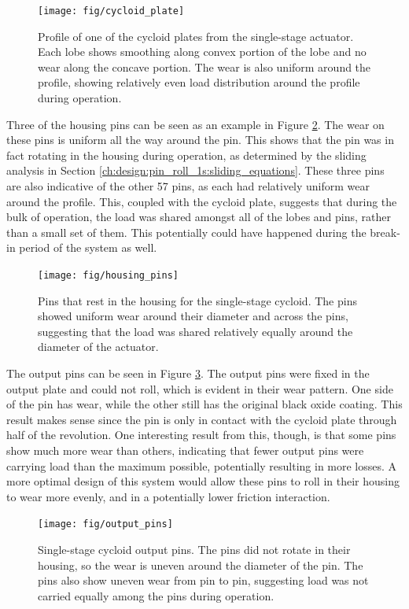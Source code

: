 \begin{figure}[!t]
   \centering
   \texttt{[image: fig/cycloid\_plate]}
   \caption{Profile of one of the cycloid plates from the single-stage actuator. Each lobe shows smoothing along convex portion of the lobe and no wear along the concave portion. The wear is also uniform around the profile, showing relatively even load distribution around the profile during operation.}
   \label{fig:cycloid_plate}
\end{figure}


Three of the housing pins can be seen as an example in Figure \ref{fig:single_housing_pins}. The wear on these pins is uniform all the way around the pin. This shows that the pin was in fact rotating in the housing during operation, as determined by the sliding analysis in Section \ref{ch:design:pin_roll_1s:sliding_equations}. These three pins are also indicative of the other 57 pins, as each had relatively uniform wear around the profile. This, coupled with the cycloid plate, suggests that during the bulk of operation, the load was shared amongst all of the lobes and pins, rather than a small set of them. This potentially could have happened during the break-in period of the system as well. 

\begin{figure}[t]
   \centering
   \texttt{[image: fig/housing\_pins]}
   \caption{Pins that rest in the housing for the single-stage cycloid. The pins showed uniform wear around their diameter and across the pins, suggesting that the load was shared relatively equally around the diameter of the actuator.}
   \label{fig:single_housing_pins}
\end{figure}


The output pins can be seen in Figure \ref{fig:single_output_pins}. The output pins were fixed in the output plate and could not roll, which is evident in their wear pattern. One side of the pin has wear, while the other still has the original black oxide coating. This result makes sense since the pin is only in contact with the cycloid plate through half of the revolution. One interesting result from this, though, is that some pins show much more wear than others, indicating that fewer output pins were carrying load than the maximum possible, potentially resulting in more losses. A more optimal design of this system would allow these pins to roll in their housing to wear more evenly, and in a potentially lower friction interaction. 

\begin{figure}[t]
   \centering
   \texttt{[image: fig/output\_pins]}
   \caption{Single-stage cycloid output pins. The pins did not rotate in their housing, so the wear is uneven around the diameter of the pin. The pins also show uneven wear from pin to pin, suggesting load was not carried equally among the pins during operation.}
   \label{fig:single_output_pins}
\end{figure}

